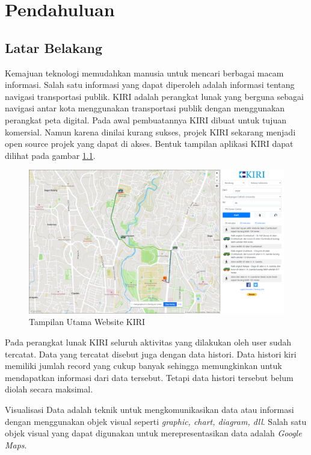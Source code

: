 \chapter{Pendahuluan}
\label{chap:intro}
   
\section{Latar Belakang}
\label{sec:latarbelakang}

Kemajuan teknologi memudahkan manusia untuk mencari berbagai macam informasi. Salah satu informasi yang dapat diperoleh adalah informasi tentang navigasi transportasi publik. KIRI  adalah perangkat lunak yang berguna sebagai navigasi antar kota menggunakan transportasi publik dengan menggunakan perangkat peta digital\cite{pascal:17:KIRI}. Pada awal pembuatannya KIRI dibuat untuk tujuan komersial. Namun karena dinilai kurang sukses, projek KIRI sekarang menjadi open source projek yang dapat di akses. Bentuk tampilan aplikasi KIRI dapat dilihat pada gambar \ref{fig:kiri}.

\begin{figure}[H]
	\centering
	\includegraphics[scale=0.3]{Gambar/kiri-example-1.png}
	\caption{Tampilan Utama Website KIRI}
	\label{fig:kiri}
\end{figure}

Pada perangkat lunak KIRI seluruh aktivitas yang dilakukan oleh user sudah tercatat. Data yang tercatat disebut juga dengan data histori. Data histori kiri memiliki jumlah record yang cukup banyak sehingga memungkinkan untuk mendapatkan informasi dari data tersebut. Tetapi data histori tersebut belum diolah secara maksimal.

Visualisasi Data adalah teknik  untuk mengkomunikasikan data atau informasi dengan menggunakan objek visual  seperti \textit{graphic, chart, diagram, dll}. Salah satu objek visual yang dapat digunakan untuk merepresentasikan data adalah \textit{Google Maps}.


